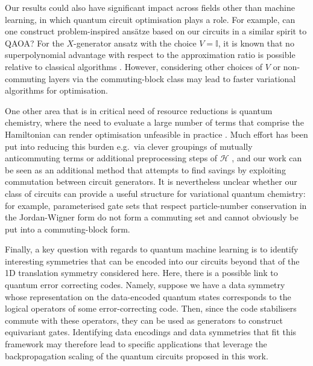 \documentclass[a4paper,twocolumn,11pt,accepted=2025-09-06]{quantumarticle}
\begin{document}
Our results could also have significant impact across fields other than machine learning, in which quantum circuit optimisation plays a role. For example, can one construct problem-inspired ans\"{a}tze based on our circuits in a similar spirit to QAOA? For the $X$-generator ansatz with the choice $V=\mathbb{I}$, it is known that no superpolynomial advantage with respect to the approximation ratio is possible relative to classical algorithms \cite{lee2021progress}. However, considering other choices of $V$ or non-commuting layers via the commuting-block class may lead to faster variational algorithms for optimisation. 

One other area that is in critical need of resource reductions is quantum chemistry, where the need to evaluate a large number of terms that comprise the Hamiltonian can render optimisation unfeasible in practice \cite{vqe_review}. Much effort has been put into reducing this burden e.g.~via clever groupings of mutually anticommuting terms \cite{Verteletskyi_Izmaylov_20,Yen_Izmaylov_20} or additional preprocessing steps of $\mathcal{H}$ \cite{Huggins_Babbush_21}, and our work can be seen as an additional method that attempts to find savings by exploiting commutation between circuit generators. It is nevertheless unclear whether our class of circuits can provide a useful structure for variational quantum chemistry: for example, parameterised gate sets that respect particle-number conservation in the Jordan-Wigner form do not form a commuting set and cannot obviously be put into a commuting-block form. 

Finally, a key question with regards to quantum machine learning is to identify interesting symmetries that can be encoded into our circuits beyond that of the 1D translation symmetry considered here. Here, there is a possible link to quantum error correcting codes. Namely, suppose we have a data symmetry whose representation on the data-encoded quantum states corresponds to the logical operators of some error-correcting code. Then, since the code stabilisers commute with these operators, they can be used as generators to construct equivariant gates. Identifying data encodings and data symmetries that fit this framework may therefore lead to specific applications that leverage the backpropagation scaling of the quantum circuits proposed in this work. 
\end{document}
